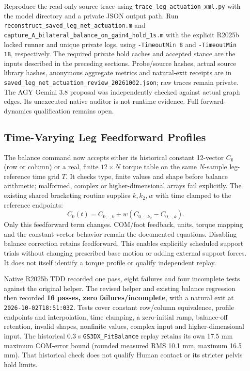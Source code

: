 \documentclass[11pt,a4paper]{article}
\begin{document}
Reproduce the read-only source trace using
\texttt{trace\_leg\_actuation\_xml.py} with the model directory and a private
JSON output path. Run \texttt{reconstruct\_saved\_leg\_net\_actuation.m}
and \texttt{capture\_A\_bilateral\_balance\_on\_gain4\_hold\_1s.m}
with the explicit R2025b locked runner and unique private logs, using
\texttt{-TimeoutMin 8} and \texttt{-TimeoutMin 18}, respectively.
The required private hold caches and accepted stance are the inputs
described in the preceding sections. Probe/source hashes, actual source
library hashes, anonymous aggregate metrics and natural-exit receipts are
in \texttt{saved\_leg\_net\_actuation\_review\_20261002.json}; raw traces
remain private. The AGY Gemini 3.8 proposal was independently checked
against actual graph edges. Its unexecuted native auditor is not runtime
evidence. Full forward-dynamics qualification remains open.


\subsection{Time-Varying Leg Feedforward Profiles}
The balance command now accepts either its historical constant 12-vector
$C_0$ (row or column) or a real, finite $12\times N$ torque table on the
same $N$-sample leg-reference time grid $T$. It checks type, finite values
and shape before balance arithmetic; malformed, complex or higher-dimensional
arrays fail explicitly. The existing shared bracketing routine supplies
$k,k_2,w$ with time clamped to the reference endpoints:
\begin{equation}
 C_0(t)=C_{0,:,k}+w(C_{0,:,k_2}-C_{0,:,k}).
\end{equation}
Only this feedforward term changes. COM/foot feedback, units, torque
mapping and the constant-vector behavior remain the documented equations.
Disabling balance correction retains feedforward. This enables explicitly
scheduled support trials without changing prescribed base motion or adding
external support forces. It does not itself identify a torque profile or
qualify independent replay.

Native R2025b TDD recorded one pass, eight failures and four incomplete
tests against the original helper. The revised helper and existing balance
regression then recorded \textbf{16 passes, zero failures/incomplete},
with a natural exit at \texttt{2026-10-02T18:51:03Z}. Tests cover constant
row/column equivalence, profile endpoints and interpolation, time clamping,
a zero-initial ramp, balance-off retention, invalid shapes, nonfinite values,
complex input and higher-dimensional input. The historical 0.3 s
\texttt{GS3DX\_FitBalance} replay retains its own 17.5 mm maximum COM-error
bound (rounded measured RMS 10.1 mm, maximum 16.5 mm). That historical check
does not qualify Human contact or its stricter pelvis hold limits.
\end{document}
